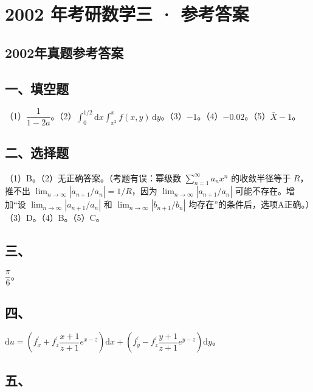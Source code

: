 \documentclass[UTF8,12pt]{ctexart}
\begin{document}
\section*{2002 年考研数学三 · 参考答案}
\subsection*{2002年真题参考答案}

\subsection*{一、填空题}

（1）\(\displaystyle \dfrac{\displaystyle 1}{\displaystyle 1-2a}\)。（2）\(\displaystyle \int_0^{1/2}\mathrm dx\displaystyle \int_{x^2}^{x}f(x,\allowbreak y)\,\mathrm dy\)。（3）\(\displaystyle -1\)。（4）\(\displaystyle -0.02\)。（5）\(\displaystyle \bar X-1\)。


\subsection*{二、选择题}

（1）B。（2）无正确答案。（考题有误：幂级数 \(\displaystyle \sum_{n=1}^{\infty}a_nx^n\) 的收敛半径等于 \(\displaystyle R\)，推不出 \(\displaystyle \lim_{n\to\infty}|a_{n+1}/a_n|=1/R\)，因为 \(\displaystyle \lim_{n\to\infty}|a_{n+1}/a_n|\) 可能不存在。增加“设 \(\displaystyle \lim_{n\to\infty}|a_{n+1}/a_n|\) 和 \(\displaystyle \lim_{n\to\infty}|b_{n+1}/b_n|\) 均存在”的条件后，选项A正确。）（3）D。（4）B。（5）C。


\subsection*{三、}

\(\displaystyle \dfrac{\displaystyle \pi}{\displaystyle 6}\)。


\subsection*{四、}

\(\displaystyle \mathrm du=\left(f_x^{\prime}+f_z^{\prime}\dfrac{\displaystyle x+1}{\displaystyle z+1}e^{x-z}\right)\mathrm dx+\left(f_y^{\prime}-f_z^{\prime}\dfrac{\displaystyle y+1}{\displaystyle z+1}e^{y-z}\right)\mathrm dy\)。


\subsection*{五、}
\end{document}
